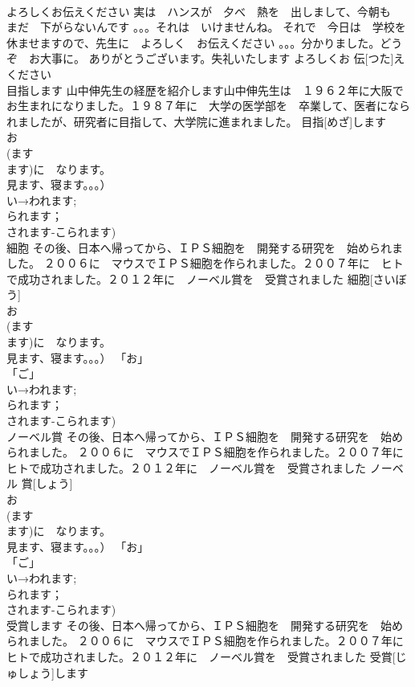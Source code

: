 \documentclass[8pt]{extreport}
\begin{document}
\begin{CJK}{UTF8}{min}
\\	よろしくお伝えください	実は　ハンスが　夕べ　熱を　出しまして、今朝も　まだ　下がらないんです 。。。それは　いけませんね。 それで　今日は　学校を　休ませますので、先生に　よろしく　お伝えください 。。。分かりました。どうぞ　お大事に。 ありがとうございます。失礼いたします	よろしくお 伝[つた]えください			
\\	目指します	山中伸先生の経歴を紹介します山中伸先生は　１９６２年に大阪で　お生まれになりました。１９８７年に　大学の医学部を　卒業して、医者になられましたが、研究者に目指して、大学院に進まれました。	目指[めざ]します			
\\	お
\\	(ます
\\	ます)に　なります。
\\	見ます、寝ます。。。）	
\\	い→われます;
\\	られます；
\\	されます-こられます)
\\	細胞	その後、日本へ帰ってから、ＩＰＳ細胞を　開発する研究を　始められました。 ２００６に　マウスでＩＰＳ細胞を作られました。２００７年に　ヒトで成功されました。２０１２年に　ノーベル賞を　受賞されました	細胞[さいぼう]				
\\	お
\\	(ます
\\	ます)に　なります。
\\	見ます、寝ます。。。） 「お」
\\	「ご」
\\	い→われます;
\\	られます；
\\	されます-こられます)
\\	ノーベル賞	その後、日本へ帰ってから、ＩＰＳ細胞を　開発する研究を　始められました。 ２００６に　マウスでＩＰＳ細胞を作られました。２００７年に　ヒトで成功されました。２０１２年に　ノーベル賞を　受賞されました	ノーベル 賞[しょう]			
\\	お
\\	(ます
\\	ます)に　なります。
\\	見ます、寝ます。。。） 「お」
\\	「ご」
\\	い→われます;
\\	られます；
\\	されます-こられます)
\\	受賞します	その後、日本へ帰ってから、ＩＰＳ細胞を　開発する研究を　始められました。 ２００６に　マウスでＩＰＳ細胞を作られました。２００７年に　ヒトで成功されました。２０１２年に　ノーベル賞を　受賞されました	受賞[じゅしょう]します			

\end{CJK}
\end{document}
